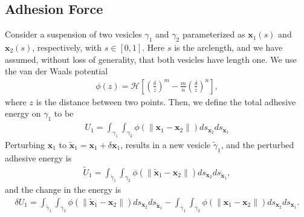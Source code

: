 \documentclass[prf,superscriptaddress,showpacs]{revtex4-1}
\newcommand{\xx}{\mathbf{x}}
\begin{document}
\begin{appendices}
\section{Adhesion Force}
\label{sec:appendixA}
Consider a suspension of two vesicles $\gamma_1$ and $\gamma_2$
parameterized as $\xx_1(s)$ and $\xx_2(s)$, respectively, with $s \in
[0,1]$.  Here $s$ is the arclength, and we have assumed, without loss of
generality, that both vesicles have length one.  We use the van der
Waals potential
\begin{align*}
  \phi(z) = \mathcal{H} \left[ 
    \left(\frac{\delta}{z}\right)^m - \frac{m}{n}\left(\frac{\delta}{z}\right)^n \right],
\end{align*}
where $z$ is the distance between two points.  Then, we define the total
adhesive energy on $\gamma_1$ to be
\begin{align*}
  U_1 = \int_{\gamma_1} \int_{\gamma_2} \phi(\|\xx_1 - \xx_2\|) 
    ds_{\xx_2} ds_{\xx_1}
\end{align*}
Perturbing $\xx_1$ to $\tilde{\xx}_1 = \xx_1 +  \delta \xx_1$, results
in a new vesicle $\tilde{\gamma}_1$, and the perturbed adhesive energy is
\begin{align*}
  \widetilde{U}_1 = \int_{\tilde{\gamma}_1} \int_{\gamma_2}
  \phi(\|\tilde{\xx}_1 - \xx_2\|) ds_{\xx_2} ds_{\tilde{\xx}_1},
\end{align*}
and the change in the energy is
\begin{align*}
  \delta U_1 = \int_{\tilde{\gamma}_1} \int_{\gamma_2}
  \phi(\|\tilde{\xx}_1 - \xx_2\|) ds_{\xx_2} ds_{\tilde{\xx}_1} - 
  \int_{\gamma_1} \int_{\gamma_2} \phi(\|\xx_1 - \xx_2\|) 
  ds_{\xx_2} ds_{\xx_1}.
\end{align*}


\end{appendices}
\end{document}
